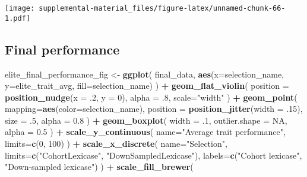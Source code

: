 \documentclass[]{book}
\newenvironment{Shaded}{\begin{snugshade}}{\end{snugshade}}
\newcommand{\DataTypeTok}[1]{\textcolor[rgb]{0.13,0.29,0.53}{#1}}
\newcommand{\DecValTok}[1]{\textcolor[rgb]{0.00,0.00,0.81}{#1}}
\newcommand{\FloatTok}[1]{\textcolor[rgb]{0.00,0.00,0.81}{#1}}
\newcommand{\KeywordTok}[1]{\textcolor[rgb]{0.13,0.29,0.53}{\textbf{#1}}}
\newcommand{\NormalTok}[1]{#1}
\newcommand{\OperatorTok}[1]{\textcolor[rgb]{0.81,0.36,0.00}{\textbf{#1}}}
\newcommand{\OtherTok}[1]{\textcolor[rgb]{0.56,0.35,0.01}{#1}}
\newcommand{\StringTok}[1]{\textcolor[rgb]{0.31,0.60,0.02}{#1}}
\begin{document}
\texttt{[image: supplemental-material\_files/figure-latex/unnamed-chunk-66-1.pdf]}

\hypertarget{final-performance-6}{%
\subsection{Final performance}\label{final-performance-6}}

\begin{Shaded}
\begin{Highlighting}[]
\NormalTok{elite_final_performance_fig <-}\StringTok{ }\KeywordTok{ggplot}\NormalTok{(}
\NormalTok{    final_data,}
    \KeywordTok{aes}\NormalTok{(}\DataTypeTok{x=}\NormalTok{selection_name, }\DataTypeTok{y=}\NormalTok{elite_trait_avg, }\DataTypeTok{fill=}\NormalTok{selection_name)}
\NormalTok{  ) }\OperatorTok{+}
\StringTok{  }\KeywordTok{geom_flat_violin}\NormalTok{(}
    \DataTypeTok{position =} \KeywordTok{position_nudge}\NormalTok{(}\DataTypeTok{x =} \FloatTok{.2}\NormalTok{, }\DataTypeTok{y =} \DecValTok{0}\NormalTok{),}
    \DataTypeTok{alpha =} \FloatTok{.8}\NormalTok{,}
    \DataTypeTok{scale=}\StringTok{"width"}
\NormalTok{  ) }\OperatorTok{+}
\StringTok{  }\KeywordTok{geom_point}\NormalTok{(}
    \DataTypeTok{mapping=}\KeywordTok{aes}\NormalTok{(}\DataTypeTok{color=}\NormalTok{selection_name),}
    \DataTypeTok{position =} \KeywordTok{position_jitter}\NormalTok{(}\DataTypeTok{width =} \FloatTok{.15}\NormalTok{),}
    \DataTypeTok{size =} \FloatTok{.5}\NormalTok{,}
    \DataTypeTok{alpha =} \FloatTok{0.8}
\NormalTok{  ) }\OperatorTok{+}
\StringTok{  }\KeywordTok{geom_boxplot}\NormalTok{(}
    \DataTypeTok{width =} \FloatTok{.1}\NormalTok{,}
    \DataTypeTok{outlier.shape =} \OtherTok{NA}\NormalTok{,}
    \DataTypeTok{alpha =} \FloatTok{0.5}
\NormalTok{  ) }\OperatorTok{+}
\StringTok{  }\KeywordTok{scale_y_continuous}\NormalTok{(}
    \DataTypeTok{name=}\StringTok{"Average trait performance"}\NormalTok{,}
    \DataTypeTok{limits=}\KeywordTok{c}\NormalTok{(}\DecValTok{0}\NormalTok{, }\DecValTok{100}\NormalTok{)}
\NormalTok{  ) }\OperatorTok{+}
\StringTok{  }\KeywordTok{scale_x_discrete}\NormalTok{(}
    \DataTypeTok{name=}\StringTok{"Selection"}\NormalTok{,}
    \DataTypeTok{limits=}\KeywordTok{c}\NormalTok{(}\StringTok{"CohortLexicase"}\NormalTok{, }\StringTok{"DownSampledLexicase"}\NormalTok{),}
    \DataTypeTok{labels=}\KeywordTok{c}\NormalTok{(}\StringTok{"Cohort lexicase"}\NormalTok{, }\StringTok{"Down-sampled lexicase"}\NormalTok{)}
\NormalTok{  ) }\OperatorTok{+}
\StringTok{  }\KeywordTok{scale_fill_brewer}\NormalTok{(}

\end{Highlighting}
\end{Shaded}
\end{document}
